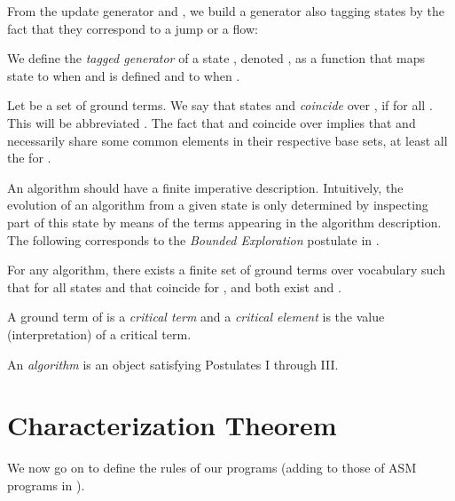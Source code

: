 \documentclass[envcountsame]{llncs}
\begin{document}
From the update generator  and , we build a
generator also tagging states by the fact that they correspond to a
jump or a flow:

\begin{definition} \label{def:behaviord}
We define the \emph{tagged generator} of a state , denoted , as a
function that maps state  to  when
 and  is defined and to  when
.
\end{definition}







Let  be a set of ground terms.
We say that states  and  \emph{coincide} over ,
if  for all .
This will be abbreviated .
The fact that   and  {coincide} over  implies that  and 
necessarily share  some common elements in their
respective base sets,  at least all the  for .


An algorithm should have a finite imperative description. Intuitively, the evolution
of an algorithm from a given state is only determined by inspecting part of this
state by means of the terms appearing in the algorithm
description. The following
corresponds to the \emph{Bounded Exploration} postulate in
\cite{Gur00}.


\begin{postulatep} \label{postulatetrois}

For any algorithm, there exists a finite set  of ground terms over
  vocabulary  such that for all states  and  that coincide
  for ,   and  both exist and .
\end{postulatep}

A ground term of  is a \emph{critical term} and a \emph{critical
  element} is the value (interpretation) of a critical term.



\begin{definition} \label{defalgo}
An \emph{algorithm} is an object satisfying Postulates I through III.
\end{definition}

\section{Characterization Theorem}



We now go on to define the rules of our programs (adding to those of ASM
programs  in \cite{Gur00}).
\end{document}

